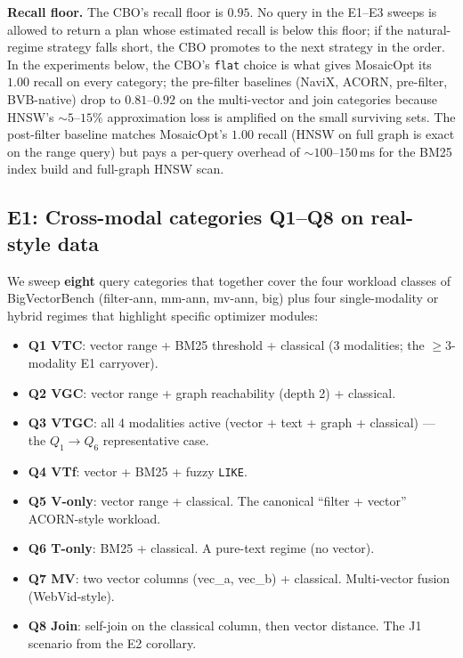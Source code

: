 \documentclass[sigconf,nonacm,review]{acmart}
\theoremstyle{plain}
\theoremstyle{definition}
\theoremstyle{remark}
\begin{document}
\textbf{Recall floor.} The CBO's recall floor is $0.95$.
No query in the E1--E3 sweeps is allowed to return a plan whose
estimated recall is below this floor; if the natural-regime
strategy falls short, the CBO promotes to the next strategy in
the order.  In the experiments below, the CBO's \texttt{flat}
choice is what gives MosaicOpt its $1.00$ recall on every
category; the pre-filter baselines (NaviX, ACORN,
pre-filter, BVB-native) drop to $0.81$--$0.92$ on the
multi-vector and join categories because HNSW's
$\sim 5$--$15\%$ approximation loss is amplified on the
small surviving sets.  The post-filter baseline matches
MosaicOpt's $1.00$ recall (HNSW on full graph is exact on the
range query) but pays a per-query overhead of $\sim 100$--$150$\,ms
for the BM25 index build and full-graph HNSW scan.

\subsection{E1: Cross-modal categories Q1--Q8 on real-style data}\label{sec:eval:e1}

We sweep \textbf{eight} query categories that together cover
the four workload classes of BigVectorBench
(filter-ann, mm-ann, mv-ann, big) plus four single-modality
or hybrid regimes that highlight specific optimizer modules:

\begin{itemize}[leftmargin=*, itemsep=1pt]
  \item \textbf{Q1 VTC}: vector range + BM25 threshold + classical
    (3 modalities; the $\ge 3$-modality E1 carryover).
  \item \textbf{Q2 VGC}: vector range + graph reachability (depth 2)
    + classical.
  \item \textbf{Q3 VTGC}: all 4 modalities active
    (vector + text + graph + classical) --- the $Q_1 \to Q_6$
    representative case.
  \item \textbf{Q4 VTf}: vector + BM25 + fuzzy \texttt{LIKE}.
  \item \textbf{Q5 V-only}: vector range + classical.  The canonical
    ``filter + vector'' ACORN-style workload.
  \item \textbf{Q6 T-only}: BM25 + classical.  A pure-text regime
    (no vector).
  \item \textbf{Q7 MV}: two vector columns (vec\_a, vec\_b) +
    classical.  Multi-vector fusion (WebVid-style).
  \item \textbf{Q8 Join}: self-join on the classical column,
    then vector distance.  The J1 scenario from the E2
    corollary.
\end{itemize}
\end{document}
